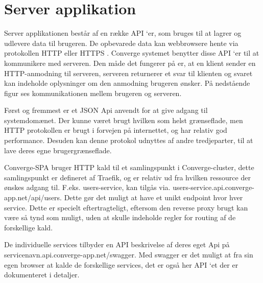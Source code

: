 \section{Server applikation}

Server applikationen består af en række API ‘er, som bruges til at lagrer og udlevere data til brugeren. De opbevarede data kan webbrowsere hente via protokollen HTTP eller HTTPS \cite[HTTP]{converge-terms} . Converge systemet benytter disse API ‘er til at kommunikere med serveren. Den måde det fungerer på er, at en klient sender en HTTP-anmodning til serveren, serveren returnerer et svar til klienten og svaret kan indeholde oplysninger om den anmodning brugeren ønsker. På nedstående figur ses kommunikationen mellem brugeren og serveren.


Først og fremmest er et JSON Api anvendt for at give adgang til systemdomænet. Der kunne været brugt hvilken som helst grænseflade, men HTTP protokollen er brugt i forvejen på internettet, og har relativ god performance. Desuden kan denne protokol udnyttes af andre tredjeparter, til at lave deres egne brugergrænseflade.

Converge-SPA bruger HTTP kald til et samlingspunkt i Converge-cluster, dette samlingspunkt er defineret af Traefik, og er relativ ud fra hvilken ressource der ønskes adgang til. F.eks. users-service, kan tilgås via. users-service.api.converge-app.net/api/users. Dette gør det muligt at have et unikt endpoint hvor hver service. Dette er specielt eftertragteligt, eftersom den reverse proxy brugt kan være så tynd som muligt, uden at skulle indeholde regler for routing af de forskellige kald.

De individuelle services tilbyder en API beskrivelse af deres eget Api på servicenavn.api.converge-app.net/swagger. Med swagger er det muligt at fra sin egen browser at kalde de forskellige services, det er også her API ‘et der er dokumenteret i detaljer.
